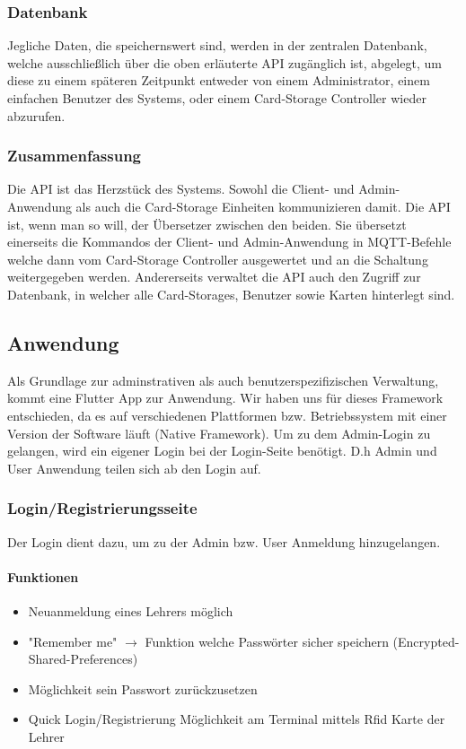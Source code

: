 \documentclass[a4paper]{article}
\begin{document}
\subsubsection{Datenbank}
Jegliche Daten, die speichernswert sind, werden in der zentralen Datenbank, welche ausschließlich über die oben erläuterte API zugänglich ist, abgelegt, um diese zu einem späteren Zeitpunkt entweder von einem Administrator, einem einfachen Benutzer des Systems, oder einem Card-Storage Controller wieder abzurufen.   

\subsubsection{Zusammenfassung}
Die API ist das Herzstück des Systems. Sowohl die Client- und Admin-Anwendung als auch die Card-Storage Einheiten kommunizieren damit. Die API ist, wenn man so will, der Übersetzer zwischen den beiden. Sie übersetzt einerseits die Kommandos der Client- und Admin-Anwendung in MQTT-Befehle welche dann vom Card-Storage Controller ausgewertet und an die Schaltung weitergegeben werden. Andererseits verwaltet die API auch den Zugriff zur Datenbank, in welcher alle Card-Storages, Benutzer sowie Karten hinterlegt sind. 

\newpage
\subsection{Anwendung}
Als Grundlage zur adminstrativen als auch benutzerspezifizischen Verwaltung, kommt eine Flutter App zur Anwendung. Wir haben uns für dieses Framework entschieden, da es auf verschiedenen Plattformen bzw. Betriebssystem mit einer Version der Software läuft (Native Framework). Um zu dem Admin-Login zu gelangen, wird ein eigener Login bei der Login-Seite benötigt. D.h Admin und User Anwendung teilen sich ab den Login auf.

\subsubsection{Login/Registrierungsseite}
Der Login dient dazu, um zu der Admin bzw. User Anmeldung hinzugelangen.
\paragraph{Funktionen}
\begin{itemize}
  \item Neuanmeldung eines Lehrers möglich
  \item "Remember me" $\rightarrow$ Funktion welche Passwörter sicher speichern (Encrypted-Shared-Preferences)
  \item Möglichkeit sein Passwort zurückzusetzen  
  \item Quick Login/Registrierung Möglichkeit am Terminal mittels Rfid Karte der Lehrer 
\end{itemize}
  
\end{document}
